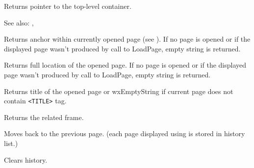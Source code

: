 \label{wxhtmlwindowgetinternalrepresentation}


Returns pointer to the top-level container.

See also: , 

\label{wxhtmlwindowgetopenedanchor}


Returns anchor within currently opened page
(see ). 
If no page is opened or if the displayed page wasn't
produced by call to LoadPage, empty string is returned.


\label{wxhtmlwindowgetopenedpage}


Returns full location of the opened page. If no page is opened or if the displayed page wasn't
produced by call to LoadPage, empty string is returned.

\label{wxhtmlwindowgetopenedpagetitle}


Returns title of the opened page or wxEmptyString if current page does not contain {\tt <TITLE>} tag.

\label{wxhtmlwindowgetrelatedframe}


Returns the related frame.

\label{wxhtmlwindowhistoryback}


Moves back to the previous page. (each page displayed using 
 is stored in history list.)

\label{wxhtmlwindowhistoryclear}


Clears history.

\label{wxhtmlwindowhistoryforward}

